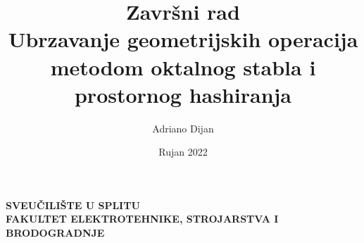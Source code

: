 \documentclass[croatian, 12pt]{report}
\title{
{Završni rad}\\
\vspace{10pt}
{
    Ubrzavanje geometrijskih operacija metodom 
    oktalnog stabla i prostornog hashiranja
}
}
\author{Adriano Dijan}
\date{Rujan 2022}
\begin{document}
\begin{center}
    \MakeUppercase{
        \large\textbf{
            Sveučilište u Splitu\\
            Fakultet elektrotehnike, strojarstva i brodogradnje
        }
    }
\end{center}

{\let\newpage\relax\maketitle}

\tableofcontents
\restoregeometry








\printbibliography[heading=bibintoc, title=Literatura]
\end{document}
